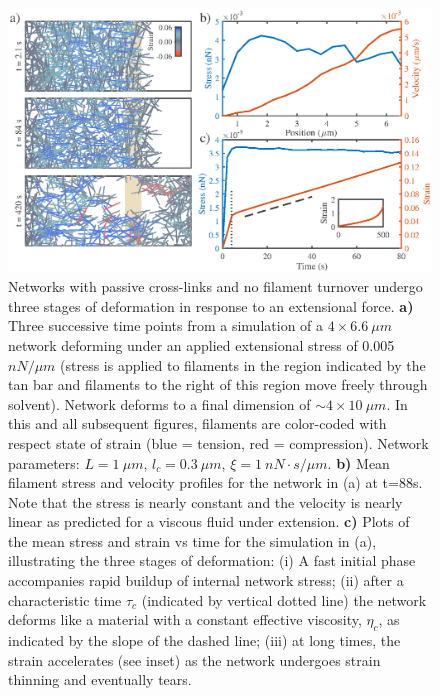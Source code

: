 \documentclass[10pt,letterpaper]{article}
\begin{document}
\begin{figure}[h!]
\centering
\includegraphics[width=\hsize]{figures/figure2}
\caption{\label{fig:passive_ex}  Networks with passive cross-links and no filament turnover undergo three stages of deformation in response to an extensional force.   \textbf{a)} Three successive time points from a simulation of a $4\times6.6\: \mu m$ network deforming under an applied extensional stress of 0.005 $nN/\mu m$ (stress is applied to filaments in the region indicated by the tan bar and filaments to the right of this region move freely through solvent). Network deforms to a final dimension of $\sim4\times10\: \mu m$. In this and all subsequent figures, filaments are color-coded with respect state of strain (blue = tension, red = compression).  Network parameters: $L=1\: \mu m$, $l_c=0.3\: \mu m$, $\xi=1\: nN\cdot s/\mu m$. \textbf{b)} Mean filament stress and velocity profiles for the  network in (a) at t=88s. Note that the stress is nearly constant and the velocity is nearly linear as predicted for a viscous fluid under extension.  \textbf{c)} Plots of the mean stress and strain vs time for the simulation in (a), illustrating the three stages of deformation: (i) A fast initial phase accompanies rapid buildup of internal network stress; (ii) after a characteristic time $\tau_c$ (indicated by vertical dotted line) the network deforms like a material with a constant effective viscosity, $\eta_c$, as indicated by the slope of the dashed line; (iii) at long times, the strain accelerates (see inset) as the network undergoes strain thinning and eventually tears. }
\end{figure}

\end{document}
